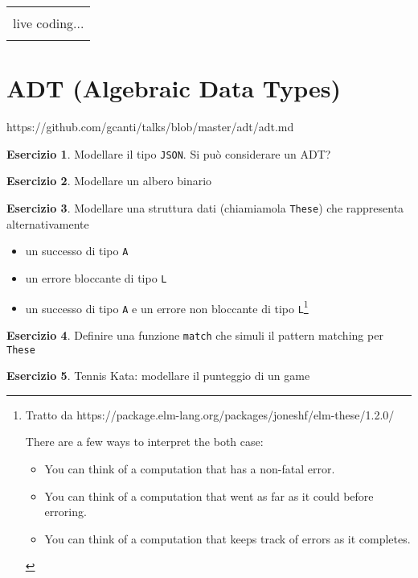 \documentclass[12pt]{article}
\theoremstyle{definition}
\newtheorem{exercise}{Esercizio}[subsection]
\newenvironment{boxed}
    {\begin{center}
    \begin{tabular}{|p{0.9\textwidth}|}
    \hline\\
    }
    {
    \\\\\hline
    \end{tabular}
    \end{center}
    }
\begin{document}
\begin{boxed}
live coding...
\end{boxed}

\newpage
\section{ADT (Algebraic Data Types)}

https://github.com/gcanti/talks/blob/master/adt/adt.md

\begin{exercise}
Modellare il tipo \texttt{JSON}. Si può considerare un ADT?
\end{exercise}

\begin{exercise}
Modellare un albero binario
\end{exercise}

\begin{exercise}
Modellare una struttura dati (chiamiamola \texttt{These}) che rappresenta alternativamente
\begin{itemize}
  \item un successo di tipo \texttt{A}
  \item un errore bloccante di tipo \texttt{L}
  \item un successo di tipo \texttt{A} e un errore non bloccante di tipo \texttt{L}\footnote{
Tratto da https://package.elm-lang.org/packages/joneshf/elm-these/1.2.0/

There are a few ways to interpret the both case:

\begin{itemize}
  \item You can think of a computation that has a non-fatal error.
  \item You can think of a computation that went as far as it could before erroring.
  \item You can think of a computation that keeps track of errors as it completes.
\end{itemize}
  }
\end{itemize}
\end{exercise}

\begin{exercise}
Definire una funzione \texttt{match} che simuli il pattern matching per \texttt{These}
\end{exercise}

\begin{exercise}
Tennis Kata: modellare il punteggio di un game
\end{exercise}
\end{document}
